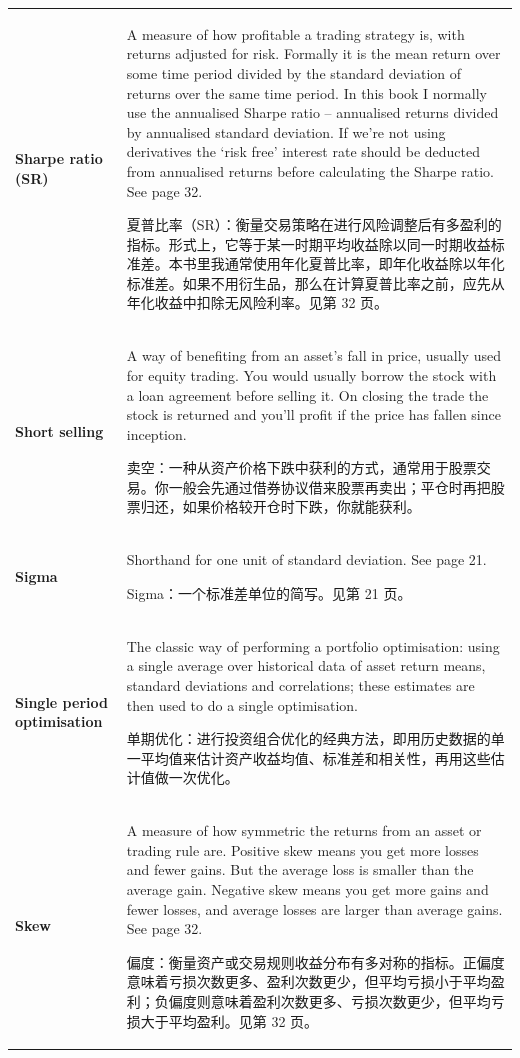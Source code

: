 \begin{chinesetableblock}
{\begin{longtable}{@{}>{\raggedright\arraybackslash\bfseries} p{}>{\raggedright\arraybackslash} p{}@{}}
Sharpe ratio (SR) & A measure of how profitable a trading strategy is, with returns adjusted for risk. Formally it is the mean return over some time period divided by the standard deviation of returns over the same time period. In this book I normally use the annualised Sharpe ratio – annualised returns divided by annualised standard deviation. If we’re not using derivatives the ‘risk free’ interest rate should be deducted from annualised returns before calculating the Sharpe ratio. See page 32. \par 夏普比率（SR）：衡量交易策略在进行风险调整后有多盈利的指标。形式上，它等于某一时期平均收益除以同一时期收益标准差。本书里我通常使用年化夏普比率，即年化收益除以年化标准差。如果不用衍生品，那么在计算夏普比率之前，应先从年化收益中扣除无风险利率。见第 32 页。 \\[0.65em]
Short selling & A way of benefiting from an asset’s fall in price, usually used for equity trading. You would usually borrow the stock with a loan agreement before selling it. On closing the trade the stock is returned and you’ll profit if the price has fallen since inception. \par 卖空：一种从资产价格下跌中获利的方式，通常用于股票交易。你一般会先通过借券协议借来股票再卖出；平仓时再把股票归还，如果价格较开仓时下跌，你就能获利。 \\[0.65em]
Sigma & Shorthand for one unit of standard deviation. See page 21. \par Sigma：一个标准差单位的简写。见第 21 页。 \\[0.65em]
Single period optimisation & The classic way of performing a portfolio optimisation: using a single average over historical data of asset return means, standard deviations and correlations; these estimates are then used to do a single optimisation. \par 单期优化：进行投资组合优化的经典方法，即用历史数据的单一平均值来估计资产收益均值、标准差和相关性，再用这些估计值做一次优化。 \\[0.65em]
Skew & A measure of how symmetric the returns from an asset or trading rule are. Positive skew means you get more losses and fewer gains. But the average loss is smaller than the average gain. Negative skew means you get more gains and fewer losses, and average losses are larger than average gains. See page 32. \par 偏度：衡量资产或交易规则收益分布有多对称的指标。正偏度意味着亏损次数更多、盈利次数更少，但平均亏损小于平均盈利；负偏度则意味着盈利次数更多、亏损次数更少，但平均亏损大于平均盈利。见第 32 页。 \\[0.65em]

\end{longtable}}
\end{chinesetableblock}

